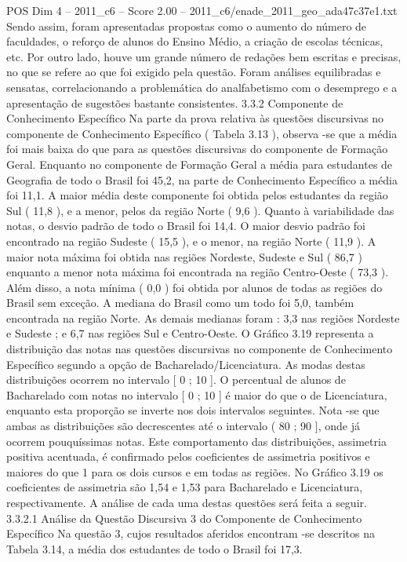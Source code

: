 \begin{textsample}{POS Dim 4 – 2011\_c6 – Score 2.00 – 2011\_c6/enade\_2011\_geo\_ada47c37e1.txt}
Sendo assim, foram apresentadas propostas como o aumento do número de faculdades, o reforço de alunos do Ensino Médio, a criação de escolas técnicas, etc.
Por outro lado, houve um grande número de redações bem escritas e precisas, no que se refere ao que foi exigido pela questão.
Foram análises equilibradas e sensatas, correlacionando a problemática do analfabetismo com o desemprego e a apresentação de sugestões bastante consistentes. 3.3.2 Componente de Conhecimento Específico Na parte da prova relativa às questões discursivas no componente de Conhecimento Específico ( Tabela 3.13 ), observa -se que a média foi mais baixa do que para as questões discursivas do componente de Formação Geral.
Enquanto no componente de Formação Geral a média para estudantes de Geografia de todo o Brasil foi 45,2, na parte de Conhecimento Específico a média foi 11,1.
A maior média deste componente foi obtida pelos estudantes da região Sul ( 11,8 ), e a menor, pelos da região Norte ( 9,6 ).
Quanto à variabilidade das notas, o desvio padrão de todo o Brasil foi 14,4.
O maior desvio padrão foi encontrado na região Sudeste ( 15,5 ), e o menor, na região Norte ( 11,9 ).
A maior nota máxima foi obtida nas regiões Nordeste, Sudeste e Sul ( 86,7 ) enquanto a menor nota máxima foi encontrada na região Centro-Oeste ( 73,3 ).
Além disso, a nota mínima ( 0,0 ) foi obtida por alunos de todas as regiões do Brasil sem exceção.
A mediana do Brasil como um todo foi 5,0, também encontrada na região Norte.
As demais medianas foram : 3,3 nas regiões Nordeste e Sudeste ; e 6,7 nas regiões Sul e Centro-Oeste.
O Gráfico 3.19 representa a distribuição das notas nas questões discursivas no componente de Conhecimento Específico segundo a opção de Bacharelado/Licenciatura.
As modas destas distribuições ocorrem no intervalo [ 0 ; 10 ].
O percentual de alunos de Bacharelado com notas no intervalo [ 0 ; 10 ] é maior do que o de Licenciatura, enquanto esta proporção se inverte nos dois intervalos seguintes.
Nota -se que ambas as distribuições são decrescentes até o intervalo ( 80 ; 90 ], onde já ocorrem pouquíssimas notas.
Este comportamento das distribuições, assimetria positiva acentuada, é confirmado pelos coeficientes de assimetria positivos e maiores do que 1 para os dois cursos e em todas as regiões.
No Gráfico 3.19 os coeficientes de assimetria são 1,54 e 1,53 para Bacharelado e Licenciatura, respectivamente.
A análise de cada uma destas questões será feita a seguir. 3.3.2.1 Análise da Questão Discursiva 3 do Componente de Conhecimento Específico Na questão 3, cujos resultados aferidos encontram -se descritos na Tabela 3.14, a média dos estudantes de todo o Brasil foi 17,3.

\end{textsample}
